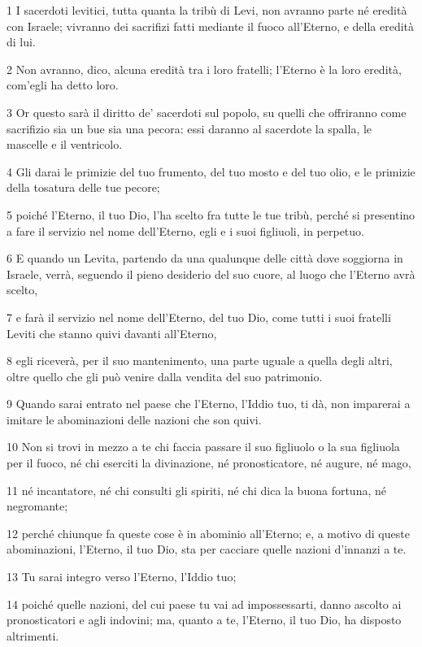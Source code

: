 \par 1 I sacerdoti levitici, tutta quanta la tribù di Levi, non avranno parte né eredità con Israele; vivranno dei sacrifizi fatti mediante il fuoco all'Eterno, e della eredità di lui.
\par 2 Non avranno, dico, alcuna eredità tra i loro fratelli; l'Eterno è la loro eredità, com'egli ha detto loro.
\par 3 Or questo sarà il diritto de' sacerdoti sul popolo, su quelli che offriranno come sacrifizio sia un bue sia una pecora: essi daranno al sacerdote la spalla, le mascelle e il ventricolo.
\par 4 Gli darai le primizie del tuo frumento, del tuo mosto e del tuo olio, e le primizie della tosatura delle tue pecore;
\par 5 poiché l'Eterno, il tuo Dio, l'ha scelto fra tutte le tue tribù, perché si presentino a fare il servizio nel nome dell'Eterno, egli e i suoi figliuoli, in perpetuo.
\par 6 E quando un Levita, partendo da una qualunque delle città dove soggiorna in Israele, verrà, seguendo il pieno desiderio del suo cuore, al luogo che l'Eterno avrà scelto,
\par 7 e farà il servizio nel nome dell'Eterno, del tuo Dio, come tutti i suoi fratelli Leviti che stanno quivi davanti all'Eterno,
\par 8 egli riceverà, per il suo mantenimento, una parte uguale a quella degli altri, oltre quello che gli può venire dalla vendita del suo patrimonio.
\par 9 Quando sarai entrato nel paese che l'Eterno, l'Iddio tuo, ti dà, non imparerai a imitare le abominazioni delle nazioni che son quivi.
\par 10 Non si trovi in mezzo a te chi faccia passare il suo figliuolo o la sua figliuola per il fuoco, né chi eserciti la divinazione, né pronosticatore, né augure, né mago,
\par 11 né incantatore, né chi consulti gli spiriti, né chi dica la buona fortuna, né negromante;
\par 12 perché chiunque fa queste cose è in abominio all'Eterno; e, a motivo di queste abominazioni, l'Eterno, il tuo Dio, sta per cacciare quelle nazioni d'innanzi a te.
\par 13 Tu sarai integro verso l'Eterno, l'Iddio tuo;
\par 14 poiché quelle nazioni, del cui paese tu vai ad impossessarti, danno ascolto ai pronosticatori e agli indovini; ma, quanto a te, l'Eterno, il tuo Dio, ha disposto altrimenti.
